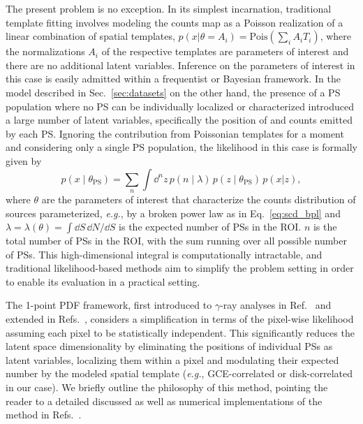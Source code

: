 \documentclass[prd,aps,10pt,nofootinbib,twocolumn,superscriptaddress,preprintnumbers,balancelastpage,longbibliography]{revtex4-1}
\begin{document}
The present problem is no exception. In its simplest incarnation, traditional template fitting involves modeling the counts map as a Poisson realization of a linear combination of spatial templates, $p(x|\theta = A_i) = \mathrm{Pois}\left(\sum_i A_i T_i\right)$, where the normalizations $A_i$ of the respective templates are parameters of interest and there are no additional latent variables. Inference on the parameters of interest in this case is easily admitted within a frequentist or Bayesian framework. In the model described in Sec.~\ref{sec:datasets} on the other hand, the presence of a PS population where no PS can be individually localized or characterized introduced a large number of latent variables, specifically the position of and counts emitted by each PS. Ignoring the contribution from Poissonian templates for a moment and considering only a single PS population, the likelihood in this case is formally given by
\begin{equation}
    \label{eq:data_likelihood}
    p(x\mid\theta_\mathrm{PS}) = \sum_{n} \int \dd^{n} z \, p\left(n\mid\lambda\right)\,p(z\mid\theta_\mathrm{PS})\,p(x|z),
\end{equation}
where $\theta$ are the parameters of interest that characterize the counts distribution of sources parameterized, \emph{e.g.}, by a broken power law as in Eq.~\eqref{eq:scd_bpl} and $\lambda = \lambda(\theta) = \int \dd S\, \dd N/\dd S$ is the expected number of PSs in the ROI. $n$ is the total number of PSs in the ROI, with the sum running over all possible number of PSs. This high-dimensional integral is computationally intractable, and traditional likelihood-based methods aim to simplify the problem setting in order to enable its evaluation in a practical setting.

The 1-point PDF framework, first introduced to $\gamma$-ray analyses in Ref.~\cite{Malyshev:2011zi} and extended in Refs.~\cite{Lee:2014mza,Lee:2015fea}, considers a simplification in terms of the pixel-wise likelihood assuming each pixel to be statistically independent. This significantly reduces the latent space dimensionality by eliminating the positions of individual PSs as latent variables, localizing them within a pixel and modulating their expected number by the modeled spatial template (\emph{e.g.}, GCE-correlated or disk-correlated in our case). We briefly outline the philosophy of this method, pointing the reader to a detailed discussed as well as numerical implementations of the method in Refs.~\cite{Lee:2015fea,Mishra-Sharma:2016gis}.
\end{document}
